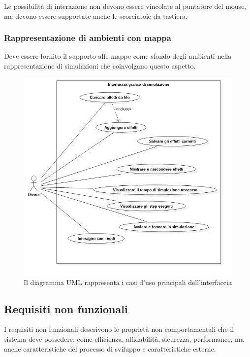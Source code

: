                 Le possibilità di interazione non devono essere vincolate al puntatore del mouse, ma devono essere supportate anche le scorciatoie da tastiera.

            \subsubsection{Rappresentazione di ambienti con mappa}\label{subsubsec:mappa}
                Deve essere fornito il supporto alle mappe come sfondo degli ambienti nella rappresentazione di simulazioni che coinvolgano questo aspetto.

            \begin{figure}[htbp]
                \centering
                \includegraphics[scale=0.65]{img/useCase}
                \caption{Il diagramma UML rappresenta i casi d'uso principali dell'interfaccia}
                \label{fig:useCase}
            \end{figure}

        \subsection{Requisiti non funzionali}\label{subsec:nonFunzionali}
            I requisiti non funzionali descrivono le proprietà non comportamentali che il sistema deve possedere, come efficienza, affidabilità, sicurezza, performance, ma anche caratteristiche del processo di sviluppo e caratteristiche esterne.

